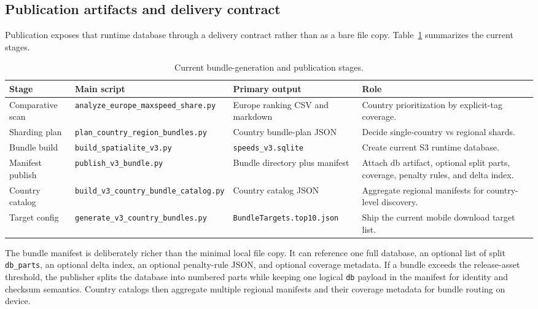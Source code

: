 \documentclass{article}
\begin{document}
\subsection{Publication artifacts and delivery contract}
Publication exposes that runtime database through a delivery contract rather than as a bare file copy. Table~\ref{tab:bundle_pipeline} summarizes the current stages.

\begin{table}[!htbp]
\centering
\scriptsize
\caption{Current bundle-generation and publication stages.}
\label{tab:bundle_pipeline}
\begin{tabular}{p{1.9cm}p{3.8cm}p{3.6cm}p{2.5cm}}
\toprule
Stage & Main script & Primary output & Role \\
\midrule
Comparative scan & \nolinkurl{analyze_europe_maxspeed_share.py} & Europe ranking CSV and markdown & Country prioritization by explicit-tag coverage. \\
Sharding plan & \nolinkurl{plan_country_region_bundles.py} & Country bundle-plan JSON & Decide single-country vs regional shards. \\
Bundle build & \nolinkurl{build_spatialite_v3.py} & \nolinkurl{speeds_v3.sqlite} & Create current S3 runtime database. \\
Manifest publish & \nolinkurl{publish_v3_bundle.py} & Bundle directory plus manifest & Attach db artifact, optional split parts, coverage, penalty rules, and delta index. \\
Country catalog & \nolinkurl{build_v3_country_bundle_catalog.py} & Country catalog JSON & Aggregate regional manifests for country-level discovery. \\
Target config & \nolinkurl{generate_v3_country_bundles.py} & \nolinkurl{BundleTargets.top10.json} & Ship the current mobile download target list. \\
\bottomrule
\end{tabular}
\end{table}

The bundle manifest is deliberately richer than the minimal local file copy. It can reference one full database, an optional list of split \texttt{db\_parts}, an optional delta index, an optional penalty-rule JSON, and optional coverage metadata. If a bundle exceeds the release-asset threshold, the publisher splits the database into numbered parts while keeping one logical \texttt{db} payload in the manifest for identity and checksum semantics. Country catalogs then aggregate multiple regional manifests and their coverage metadata for bundle routing on device.
\end{document}
